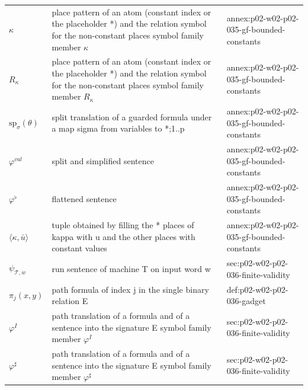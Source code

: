 \begin{longtable}{@{}p{}p{}p{}@{}}
\(\kappa\) & place pattern of an atom (constant index or the placeholder *) and the relation symbol for the non-constant places symbol family member \(\kappa\) & annex:\allowbreak{}p02-\allowbreak{}w02-\allowbreak{}p02-\allowbreak{}035-\allowbreak{}gf-\allowbreak{}bounded-\allowbreak{}constants \\
\(R_\kappa\) & place pattern of an atom (constant index or the placeholder *) and the relation symbol for the non-constant places symbol family member \(R_\kappa\) & annex:\allowbreak{}p02-\allowbreak{}w02-\allowbreak{}p02-\allowbreak{}035-\allowbreak{}gf-\allowbreak{}bounded-\allowbreak{}constants \\
\(\mathrm{sp}_\sigma(\theta)\) & split translation of a guarded formula under a map sigma from variables to {*;1..p} & annex:\allowbreak{}p02-\allowbreak{}w02-\allowbreak{}p02-\allowbreak{}035-\allowbreak{}gf-\allowbreak{}bounded-\allowbreak{}constants \\
\(\varphi^{\mathit{val}}\) & split and simplified sentence & annex:\allowbreak{}p02-\allowbreak{}w02-\allowbreak{}p02-\allowbreak{}035-\allowbreak{}gf-\allowbreak{}bounded-\allowbreak{}constants \\
\(\varphi^{\flat}\) & flattened sentence & annex:\allowbreak{}p02-\allowbreak{}w02-\allowbreak{}p02-\allowbreak{}035-\allowbreak{}gf-\allowbreak{}bounded-\allowbreak{}constants \\
\(\langle\kappa,\allowbreak \bar u\rangle\) & tuple obtained by filling the * places of kappa with u and the other places with constant values & annex:\allowbreak{}p02-\allowbreak{}w02-\allowbreak{}p02-\allowbreak{}035-\allowbreak{}gf-\allowbreak{}bounded-\allowbreak{}constants \\
\(\psi_{\mathcal T,w}\) & run sentence of machine T on input word w & sec:\allowbreak{}p02-\allowbreak{}w02-\allowbreak{}p02-\allowbreak{}036-\allowbreak{}finite-\allowbreak{}validity \\
\(\pi_j(x,\allowbreak y)\) & path formula of index j in the single binary relation E & def:\allowbreak{}p02-\allowbreak{}w02-\allowbreak{}p02-\allowbreak{}036-\allowbreak{}gadget \\
\(\varphi^{I}\) & path translation of a formula and of a sentence into the signature {E} symbol family member \(\varphi^{I}\) & sec:\allowbreak{}p02-\allowbreak{}w02-\allowbreak{}p02-\allowbreak{}036-\allowbreak{}finite-\allowbreak{}validity \\
\(\varphi^{\sharp}\) & path translation of a formula and of a sentence into the signature {E} symbol family member \(\varphi^{\sharp}\) & sec:\allowbreak{}p02-\allowbreak{}w02-\allowbreak{}p02-\allowbreak{}036-\allowbreak{}finite-\allowbreak{}validity \\

\end{longtable}
